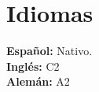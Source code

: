 \documentclass[letterpaper,11pt]{article}
\begin{document}
\section{Idiomas}
 \begin{itemize}[leftmargin=0.15in, label={}]
    \small{\item{
     \textbf{Español: }{Nativo.} \\
     \textbf{Inglés: }{C2} \\
     \textbf{Alemán: }{A2} \\
    }}
 \end{itemize}


\end{document}
